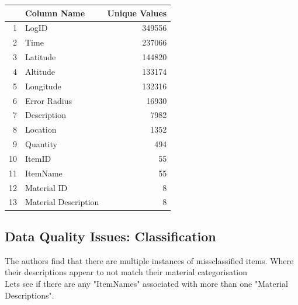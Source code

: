 \documentclass[10pt]{article}\usepackage[]{graphicx}\usepackage[]{color}
\begin{document}
\begin{table}[ht]
\centering
\begin{tabular}{rlr}
  \hline
 & Column Name & Unique Values \\ 
  \hline
1 & LogID & 349556 \\ 
  2 & Time & 237066 \\ 
  3 & Latitude & 144820 \\ 
  4 & Altitude & 133174 \\ 
  5 & Longitude & 132316 \\ 
  6 & Error Radius & 16930 \\ 
  7 & Description & 7982 \\ 
  8 & Location & 1352 \\ 
  9 & Quantity & 494 \\ 
  10 & ItemID &  55 \\ 
  11 & ItemName &  55 \\ 
  12 & Material ID &   8 \\ 
  13 & Material Description &   8 \\ 
   \hline
\end{tabular}
\end{table}



\pagebreak
\subsection{Data Quality Issues: Classification}

The authors find that there are multiple instances of missclassified items. Where their descriptions appear to not match their material categorisation\\
Lets see if there are any "ItemNames" associated with more than one "Material Descriptions".
\end{document}
